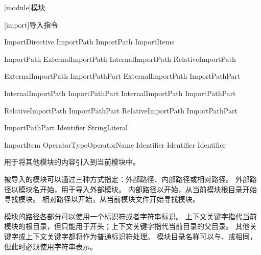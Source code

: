 
[module]{模块}

[import]{导入指令}

\begin{bnf}{ImportDirective}
     ImportPath \terminal{;} \br
     ImportPath \terminal{:} ImportItems \terminal{;}
\end{bnf}

\begin{bnf}{ImportPath}
    ExternalImportPath \br
    InternalImportPath \br
    RelativeImportPath
\end{bnf}

\begin{bnf}{ExternalImportPath}
    ImportPathPart \br
    ExternalImportPath  ImportPathPart
\end{bnf}

\begin{bnf}{InternalImportPath}
      ImportPathPart \br
    InternalImportPath  ImportPathPart
\end{bnf}

\begin{bnf}{RelativeImportPath}
      ImportPathPart \br
    RelativeImportPath  ImportPathPart
\end{bnf}

\begin{bnf}{ImportPathPart}
    Identifier \br
    StringLiteral \br
\end{bnf}

\begin{bnf}{ImportItem}
    \terminal{*} \br
     \br
     OperatorType\bnfq OperatorName \br
    Identifier \br
    Identifier  Identifier
\end{bnf}

\pnum
{}用于将其他模块的内容引入到当前模块中。

\pnum
被导入的模块可以通过三种方式指定：外部路径、内部路径或相对路径。
外部路径以模块名开始，用于导入外部模块。
内部路径以开始，从当前模块根目录开始寻找模块。
相对路径以开始，从当前模块文件开始寻找模块。

\pnum
模块的路径各部分可以使用一个标识符或者字符串标识。
上下文关键字指代当前模块的根目录，但只能用于开头；上下文关键字指代当前目录的父目录。
其他关键字或上下文关键字都将作为普通标识符处理。
模块目录名称可以与、或相同，但此时必须使用字符串表示。

